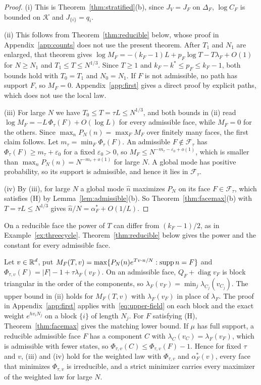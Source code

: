 \begin{proof}
(i) This is Theorem~\ref{thm:stratified}(b), since $J_V=J_F$ on $\Delta_F$, $\log C_F$
is bounded on $\mathcal K$ and $J_{\{i\}}=q_i$.

(ii) This follows from Theorem~\ref{thm:reducible} below, whose proof in
Appendix~\ref{app:counts} does not use the present theorem. After $T_1$ and $N_1$ are
enlarged, that theorem gives $\log M_F=-(k_F-1)L+p_F\log T-T\lambda_F+O(1)$ for $N\ge N_1$ and
$T_1\le T\le N^{1/3}$. Since $T\ge1$ and $k_F-k^*\le p_F\le k_F-1$, both bounds hold with
$T_0=T_1$ and $N_0=N_1$. If $F$ is not admissible, no path has support $F$, so $M_F=0$.
Appendix~\ref{app:first} gives a direct proof by explicit paths, which does not
use the local law.

(iii) For large $N$ we have $T_0\le T=\tau L\le N^{1/3}$, and both bounds in (ii)
read $\log M_F=-L\,\Phi_\tau(F)+O(\log L)$ for every admissible face, while
$M_F=0$ for the others. Since $\max_nP_N(n)=\max_FM_F$ over finitely many faces,
the first claim follows. Let $m_\tau=\min_F\Phi_\tau(F)$. An admissible
$F\notin\mathcal F_\tau$ has $\Phi_\tau(F)\ge m_\tau+\varepsilon_0$ for a fixed
$\varepsilon_0>0$, so $M_F\le N^{-m_\tau-\varepsilon_0+o(1)}$, which is smaller
than $\max_nP_N(n)=N^{-m_\tau+o(1)}$ for large $N$. A global mode has positive
probability, so its support is admissible, and hence it lies in $\mathcal F_\tau$.

(iv) By (iii), for large $N$ a global mode $\hat n$ maximizes $P_N$ on its face
$F\in\mathcal F_\tau$, which satisfies (H) by Lemma~\ref{lem:admissible}(b). So
Theorem~\ref{thm:facemax}(b) with $T=\tau L\le N^{1/3}$ gives
$\hat n/N=\alpha^*_F+O(1/L)$.
\end{proof}

On a reducible face the power of $T$ can differ from $(k_F-1)/2$, as in
Example~\ref{ex:threecycle}. Theorem~\ref{thm:reducible} below gives the power and the constant
for every admissible face.

\begin{remark}[a field]\label{rem:first-field}
Let $v\in\mathbb{R}^d$, put $M_F(T,v)=\max\{P_N(n)e^{Tv\cdot n/N}:\operatorname{supp} n=F\}$ and
$\Phi_{\tau,v}(F)=|F|-1+\tau\lambda_F(v_F)$. On an admissible face,
$Q_F+\operatorname{diag}v_F$ is block triangular in the order of the
components, so $\lambda_F(v_F)=\min_j\lambda_{C_j}(v_{C_j})$. The upper bound in
(ii) holds for $M_F(T,v)$ with $\lambda_F(v_F)$ in place of $\lambda_F$. The proof
in Appendix~\ref{app:first} applies with~\eqref{eq:upper-field} on each block and
the exact weight $e^{hv_iN_j}$ on a block $\{i\}$ of length $N_j$. For $F$ satisfying (H),
Theorem~\ref{thm:facemax} gives the matching lower bound. If $\mu$ has full
support, a reducible admissible face $F$ has a component $C$ with
$\lambda_C(v_C)=\lambda_F(v_F)$, which is admissible with fewer states, so
$\Phi_{\tau,v}(C)\le\Phi_{\tau,v}(F)-1$. Hence for
fixed $\tau$ and $v$, (iii)
and (iv) hold for the weighted law with $\Phi_{\tau,v}$ and $\alpha^*_F(v)$, every
face that minimizes $\Phi_{\tau,v}$ is irreducible, and a strict minimizer carries
every maximizer of the weighted law for large $N$.
\end{remark}

